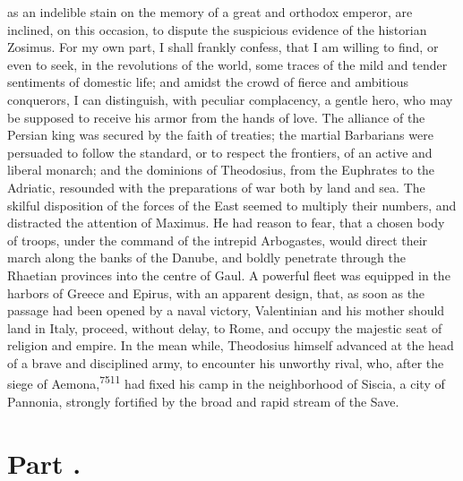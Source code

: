 as an indelible stain on the memory of a great and orthodox
emperor, are inclined, on this occasion, to dispute the
suspicious evidence of the historian Zosimus. For my own part, I
shall frankly confess, that I am willing to find, or even to
seek, in the revolutions of the world, some traces of the mild
and tender sentiments of domestic life; and amidst the crowd of
fierce and ambitious conquerors, I can distinguish, with peculiar
complacency, a gentle hero, who may be supposed to receive his
armor from the hands of love. The alliance of the Persian king
was secured by the faith of treaties; the martial Barbarians were
persuaded to follow the standard, or to respect the frontiers, of
an active and liberal monarch; and the dominions of Theodosius,
from the Euphrates to the Adriatic, resounded with the
preparations of war both by land and sea. The skilful disposition
of the forces of the East seemed to multiply their numbers, and
distracted the attention of Maximus. He had reason to fear, that
a chosen body of troops, under the command of the intrepid
Arbogastes, would direct their march along the banks of the
Danube, and boldly penetrate through the Rhaetian provinces into
the centre of Gaul. A powerful fleet was equipped in the harbors
of Greece and Epirus, with an apparent design, that, as soon as
the passage had been opened by a naval victory, Valentinian and
his mother should land in Italy, proceed, without delay, to Rome,
and occupy the majestic seat of religion and empire. In the mean
while, Theodosius himself advanced at the head of a brave and
disciplined army, to encounter his unworthy rival, who, after the
siege of Aemona,\textsuperscript{7511} had fixed his camp in the neighborhood of
Siscia, a city of Pannonia, strongly fortified by the broad and
rapid stream of the Save.



\section{Part \thesection.}

